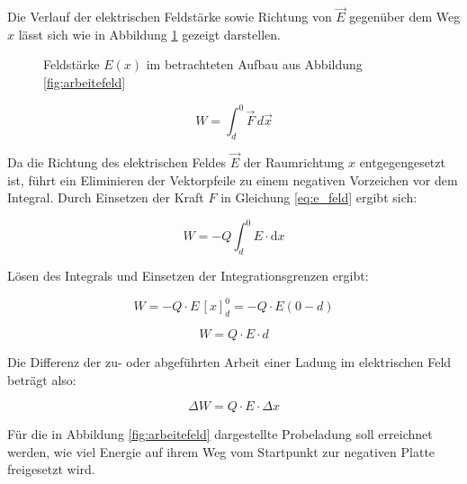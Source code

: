 \begin{frame}
{	
	Die Verlauf der elektrischen Feldstärke sowie Richtung von $\vec{E}$ gegenüber dem Weg $x$ lässt sich wie in Abbildung \ref{fig:evsx} gezeigt darstellen.



	\begin{figure}[ht]
		\centering
		\caption{Feldstärke $E(x)$ im betrachteten Aufbau aus Abbildung \ref{fig:arbeitefeld}}
		\label{fig:evsx}
	\end{figure}



		
\begin{equation*}
	W = \int_{d}^{0}  \vec{F} \, d \vec{x} 
\end{equation*}

Da die Richtung des elektrischen Feldes $\vec{E}$ der Raumrichtung $x$ 
entgegengesetzt ist, führt ein Eliminieren der Vektorpfeile zu einem negativen Vorzeichen vor dem Integral.
Durch Einsetzen der Kraft $F$ in Gleichung \ref{eq:e_feld} ergibt sich:

\begin{equation*}
	W = - Q \int_{d}^{0} E \cdot \mathrm{d}x 
\end{equation*}

Lösen des Integrals und Einsetzen der Integrationsgrenzen ergibt:

\begin{equation*}
	 W = -Q \cdot E \, [x]_d^0 = -Q \cdot E (0-d) 
\end{equation*} 

\begin{equation*}
	 W = Q \cdot E \cdot d
\end{equation*}

Die Differenz der zu- oder abgeführten Arbeit einer Ladung im elektrischen Feld beträgt also:

\begin{equation}
	\Delta W = Q \cdot E \cdot \Delta x 
\end{equation}

\begin{bsp}{}{}

	Für die in Abbildung \ref{fig:arbeitefeld} dargestellte Probeladung soll erreichnet werden, wie viel Energie auf ihrem Weg vom
    Startpunkt zur negativen Platte freigesetzt wird.\\
\phantom{text}\\


\end{bsp}}
\end{frame}
